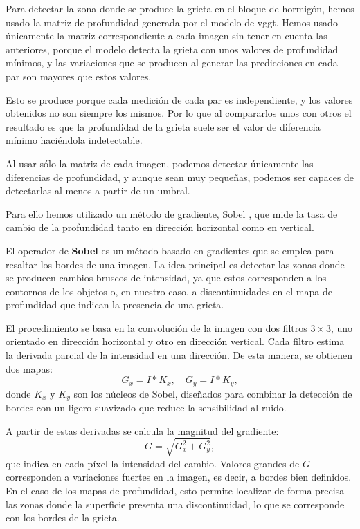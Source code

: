 Para detectar la zona donde se produce la grieta en el bloque de hormigón, hemos usado la matriz de profundidad generada por el modelo de vggt. Hemos usado únicamente la matriz correspondiente a cada imagen sin tener en cuenta las anteriores, porque el modelo detecta la grieta con unos valores de profundidad mínimos, y las variaciones que se producen al generar las predicciones en cada par son mayores que estos valores. 

Esto se produce porque cada medición de cada par es independiente, y los valores obtenidos no son siempre los mismos. Por lo que al compararlos unos con otros el resultado es que la profundidad de la
grieta suele ser el valor de diferencia mínimo haciéndola indetectable.

Al usar sólo la matriz de cada imagen, podemos detectar únicamente las diferencias de profundidad, y aunque sean muy pequeñas, podemos ser capaces de detectarlas al menos a partir de un umbral.

Para ello hemos utilizado un método de gradiente, Sobel \cite{sobel1973}, que mide la tasa de cambio de la profundidad tanto en dirección horizontal como en vertical. 

El operador de \textbf{Sobel} \cite{sobel1973} es un método basado en gradientes que se emplea para resaltar los bordes de una imagen. La idea principal es detectar las zonas donde se producen cambios bruscos de intensidad, ya que estos corresponden a los contornos de los objetos o, en nuestro caso, a discontinuidades en el mapa de profundidad que indican la presencia de una grieta.

El procedimiento se basa en la convolución de la imagen con dos filtros \(3\times 3\), uno orientado en dirección horizontal y otro en dirección vertical. Cada filtro estima la derivada parcial de la intensidad en una dirección. De esta manera, se obtienen dos mapas: 
\[
G_x = I * K_x, \quad G_y = I * K_y,
\]
donde \(K_x\) y \(K_y\) son los núcleos de Sobel, diseñados para combinar la detección de bordes con un ligero suavizado que reduce la sensibilidad al ruido.

A partir de estas derivadas se calcula la magnitud del gradiente:
\[
G = \sqrt{G_x^2 + G_y^2},
\]
que indica en cada píxel la intensidad del cambio. Valores grandes de \(G\) corresponden a variaciones fuertes en la imagen, es decir, a bordes bien definidos. En el caso de los mapas de profundidad, esto permite localizar de forma precisa las zonas donde la superficie presenta una discontinuidad, lo que se corresponde con los bordes de la grieta.

